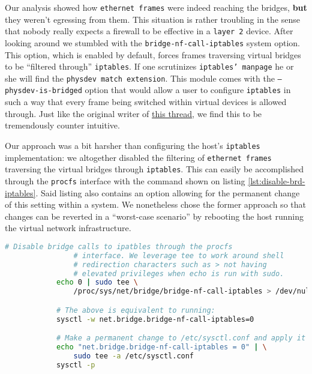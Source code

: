 
        Our analysis showed how \texttt{ethernet frames} were indeed reaching the bridges, \textbf{but} they weren't egressing from them. This situation is rather troubling in the sense that nobody really expects a firewall to be effective in a \texttt{layer 2} device. After looking around we stumbled with the \texttt{bridge-nf-call-iptables} system option. This option, which is enabled by default, forces frames traversing virtual bridges to be ``filtered through'' \texttt{iptables}. If one scrutinizes \texttt{iptables' manpage} he or she will find the \texttt{physdev match extension}. This module comes with the \texttt{--physdev-is-bridged} option that would allow a user to configure \texttt{iptables} in such a way that every frame being switched within virtual devices is allowed through. Just like the original writer of \href{http://patchwork.ozlabs.org/project/netdev/patch/1246379267.3749.42.camel@blaa/}{this thread}, we find this to be tremendously counter intuitive.

        Our approach was a bit harsher than configuring the host's \texttt{iptables} implementation: we altogether disabled the filtering of \texttt{ethernet frames} traversing the virtual bridges through \texttt{iptables}. This can easily be accomplished through the \texttt{procfs} interface with the command shown on listing \ref{lst:disable-brd-iptables}. Said listing also contains an option allowing for the permanent change of this setting within a system. We nonetheless chose the former approach so that changes can be reverted in a ``worst-case scenario'' by rebooting the host running the virtual network infrastructure.

        \begin{lstlisting}[language = bash, caption = Disabling bridge calls to \texttt{iptables}., label = lst:disable-brd-iptables]
            # Disable bridge calls to ipatbles through the procfs
                # interface. We leverage tee to work around shell
                # redirection characters such as > not having
                # elevated privileges when echo is run with sudo.
            echo 0 | sudo tee \
                /proc/sys/net/bridge/bridge-nf-call-iptables > /dev/null

            # The above is equivalent to running:
            sysctl -w net.bridge.bridge-nf-call-iptables=0

            # Make a permanent change to /etc/sysctl.conf and apply it
            echo "net.bridge.bridge-nf-call-iptables = 0" | \
                sudo tee -a /etc/sysctl.conf
            sysctl -p
        \end{lstlisting}

